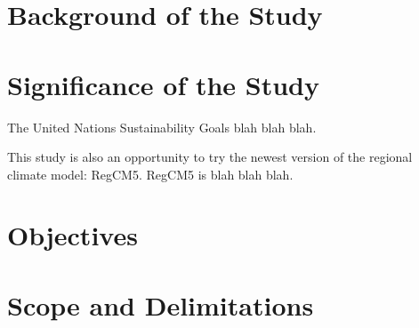 \section{Background of the Study}

\section{Significance of the Study}
	The United Nations Sustainability Goals blah blah blah.
	
	This study is also an opportunity to try the newest version of the regional climate model: RegCM5. RegCM5 is blah blah blah.

\section{Objectives}

\section{Scope and Delimitations}